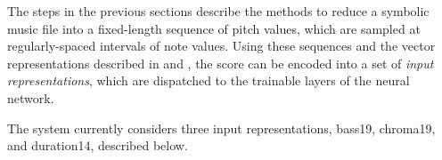 
The steps in the previous sections describe the methods to
reduce a symbolic music file into a fixed-length sequence of
pitch values, which are sampled at regularly-spaced
intervals of \musThirtySecond note values. Using these
sequences and the vector representations described in
 and
, the score can be encoded into
a set of \emph{input representations}, which are dispatched
to the trainable layers of the neural network. 

The system currently considers three input representations,
\gls{bass19}, \gls{chroma19}, and \gls{duration14},
described below.


